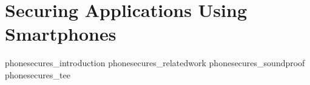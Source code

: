 \part[Securing Applications Using Smartphones]{Securing Applications Using Smartphones}\label{part:phonesecures}

{phonesecures_introduction}
{phonesecures_relatedwork}
{phonesecures_soundproof}
{phonesecures_tee}
